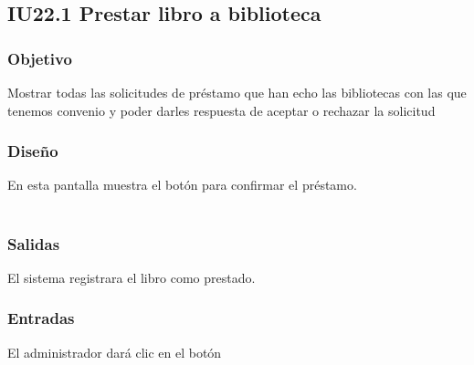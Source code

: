 \newpage
\subsection{IU22.1 Prestar libro a biblioteca}

\subsubsection{Objetivo}
	Mostrar todas las solicitudes de préstamo que han echo las bibliotecas con las que tenemos convenio y poder darles respuesta de aceptar o rechazar la solicitud  

\subsubsection{Diseño}
	En esta pantalla muestra el botón  para confirmar el préstamo.  \\\\


\subsubsection{Salidas}
	\begin{Citemize}
		\item El sistema registrara el libro como prestado. 
	\end{Citemize}
	
\subsubsection{Entradas}
	\begin{Citemize}
		\item El administrador dará clic en el botón 
	\end{Citemize}


